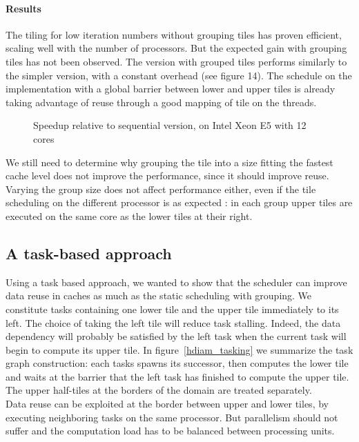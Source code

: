 \documentclass[a4paper,11pt]{article}
\begin{document}
\paragraph{Results} The tiling for low iteration numbers without grouping tiles has proven efficient,
scaling well with the number of processors. But the expected gain with grouping tiles
has not been observed. The version with grouped tiles performs similarly to the simpler
version, with a constant overhead (see figure 14). The schedule on the implementation
with a global barrier between lower and upper tiles is already taking advantage of reuse
through a good mapping of tile on the threads. \\
\begin{figure}
% 
 \caption{Speedup relative to sequential version, on Intel Xeon E5 with 12 cores}
 \label{jbi_res_grp}
\end{figure}



We still need to determine why grouping the tile into a size fitting the fastest cache
level does not improve the performance, since it should improve reuse. Varying the group
size does not affect performance either, even if the tile scheduling on the different processor
is as expected : in each group upper tiles are executed on the same core as the lower tiles
at their right.

\subsection{A task-based approach}
Using a task based approach, we wanted to show that the scheduler can improve data reuse
in caches as much as the static scheduling with grouping. We constitute tasks containing
one lower tile and the upper tile immediately to its left. The choice of taking the left
tile will reduce task stalling. Indeed, the data dependency will probably be satisfied by
the left task when the current task will begin to compute its upper tile. In figure~\ref{hdiam_tasking} we
summarize the task graph construction: each tasks spawns its successor, then computes
the lower tile and waits at the barrier that the left task has finished to compute the upper
tile. The upper half-tiles at the borders of the domain are treated separately.\\
Data reuse can be exploited at the border between upper and lower tiles, by executing
neighboring tasks on the same processor. But parallelism should not suffer and the computation 
load has to be balanced between processing units.
\end{document}
